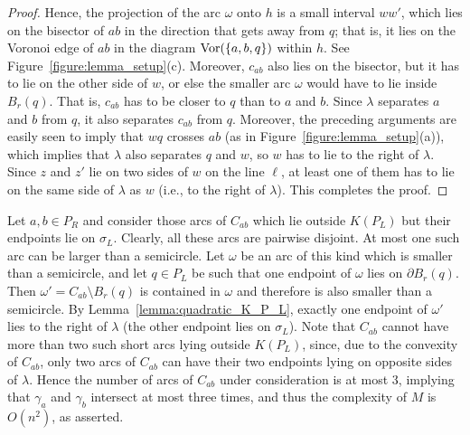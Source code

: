 \documentclass[a4paper,12pt]{article}
\def\bd{{\partial}}
\def\Vor{{\rm Vor}}
\begin{document}
\begin{proof}
Hence, the projection of the arc $\omega$ onto $h$ is a small
interval $ww'$, which lies on the bisector of $ab$ in the
direction that gets away from $q$; that is, it lies on the Voronoi
edge of $ab$ in the diagram $\Vor(\{a,b,q\})$ within $h$. See Figure~\ref{figure:lemma_setup}(c).
Moreover, $c_{ab}$ also lies on the bisector, but it has to lie on the
other side of $w$, or else the smaller arc $\omega$ would have to lie
inside $B_r(q)$. That is, $c_{ab}$ has to be closer to $q$ than to $a$
and $b$. Since $\lambda$ separates $a$ and $b$ from $q$, it also separates
 $c_{ab}$ from $q$. Moreover, the preceding arguments are easily seen to imply that $wq$ crosses $ab$ (as in Figure~\ref{figure:lemma_setup}(a)), which implies that $\lambda$ also separates $q$ and $w$, so
$w$ has to lie to the right of $\lambda$. Since $z$ and $z'$ lie on
two sides of $w$ on the line $\ell$, at least one of them has to lie on
the same side of $\lambda$ as $w$ (i.e., to the right of
$\lambda$). This completes the proof.
\end{proof}

Let $a,b \in P_R$ and consider those arcs of $C_{ab}$ which lie outside $K(P_L)$ but their endpoints lie on $\sigma_L$. Clearly, all these arcs are pairwise disjoint. At most one such arc can be larger than a semicircle. Let $\omega$ be an arc of this kind which is smaller than a semicircle, and let $q \in P_L$ be such that one endpoint of $\omega$ lies on $\bd B_r(q)$. Then $\omega' = C_{ab} \setminus B_r(q)$ is contained in $\omega$ and therefore is also smaller than a semicircle. By Lemma~\ref{lemma:quadratic_K_P_L}, exactly one endpoint of $\omega'$ lies to the right of $\lambda$ (the other endpoint lies on $\sigma_L$).
Note that $C_{ab}$ cannot have more than two such short arcs lying outside $K(P_L)$, since, due to the convexity of $C_{ab}$, only two arcs of $C_{ab}$ can have their two endpoints lying on opposite sides of $\lambda$. Hence the number of arcs of $C_{ab}$ under consideration is at most 3, implying that $\gamma_a$ and $\gamma_b$ intersect at most three times, and thus the complexity of $M$ is $O(n^2)$, as asserted.
\end{document}
